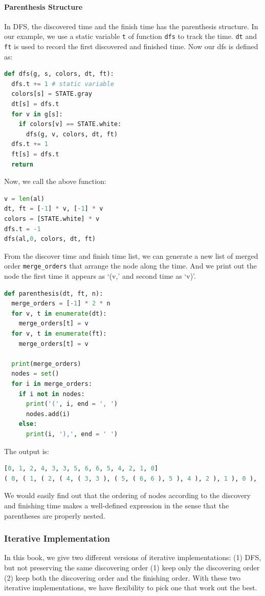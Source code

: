 \documentclass[main.tex]{subfiles}
\begin{document}
\paragraph{Parenthesis Structure} In DFS, the discovered time and the finish time has the parenthesis structure. In our example, we use a static variable \texttt{t} of function \texttt{dfs} to track the time. \texttt{dt} and \texttt{ft} is used to record the first discovered and finished time. Now our dfs is defined as:
\begin{lstlisting}[language=Python]
def dfs(g, s, colors, dt, ft):
  dfs.t += 1 # static variable
  colors[s] = STATE.gray
  dt[s] = dfs.t
  for v in g[s]:
    if colors[v] == STATE.white:
      dfs(g, v, colors, dt, ft)
  dfs.t += 1
  ft[s] = dfs.t
  return
\end{lstlisting}
Now, we call the above function:
\begin{lstlisting}[language=Python]
v = len(al)
dt, ft = [-1] * v, [-1] * v
colors = [STATE.white] * v
dfs.t = -1
dfs(al,0, colors, dt, ft)
\end{lstlisting}
From the discover time and finish time list, we can generate a new list of merged order \texttt{merge\_orders} that arrange the node along the time. And we print out the node the first time it appears as `(v,' and second time as `v)'.
\begin{lstlisting}[language=Python]
def parenthesis(dt, ft, n):
  merge_orders = [-1] * 2 * n
  for v, t in enumerate(dt):
    merge_orders[t] = v
  for v, t in enumerate(ft):
    merge_orders[t] = v

  print(merge_orders)
  nodes = set()
  for i in merge_orders:
    if i not in nodes:
      print('(', i, end = ', ')
      nodes.add(i)
    else:
      print(i, '),', end = ' ')
\end{lstlisting}
The output is:
\begin{lstlisting}[language=Python]
[0, 1, 2, 4, 3, 3, 5, 6, 6, 5, 4, 2, 1, 0]
( 0, ( 1, ( 2, ( 4, ( 3, 3 ), ( 5, ( 6, 6 ), 5 ), 4 ), 2 ), 1 ), 0 ), 
\end{lstlisting}
We would easily find out that the ordering of nodes according to the discovery and finishing time makes a well-defined expression in the sense that the parentheses are properly nested.

\subsubsection{Iterative Implementation} 
In this book, we give two different versions of iterative implementations: (1) DFS, but not preserving the same discovering order (1) keep only the discovering order (2) keep both the discovering order and the finishing order. With these two iterative implementations, we have flexibility to pick one that work out the best. 
\end{document}
